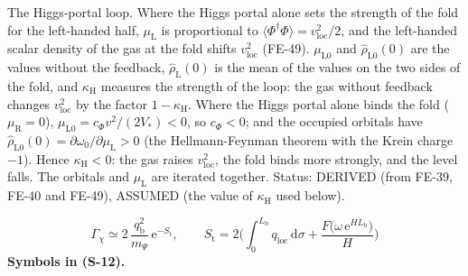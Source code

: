 \documentclass[
  10pt,
]{article}
\begin{document}
The Higgs-portal loop. Where the Higgs portal alone sets the strength of
the fold for the left-handed half, \(\mu_{\mathrm{L}}\) is proportional
to \(\langle\Phi^\dagger\Phi\rangle = v_{\mathrm{loc}}^2/2\), and the
left-handed scalar density of the gas at the fold shifts
\(v_{\mathrm{loc}}^2\) (FE-49). \(\mu_{\mathrm{L}0}\) and
\(\hat\rho_{\mathrm{L}0}(0)\) are the values without the feedback,
\(\hat\rho_{\mathrm{L}}(0)\) is the mean of the values on the two sides
of the fold, and \(\kappa_{\mathrm{H}}\) measures the strength of the
loop: the gas without feedback changes \(v_{\mathrm{loc}}^2\) by the
factor \(1 - \kappa_{\mathrm{H}}\). Where the Higgs portal alone binds
the fold (\(\mu_{\mathrm{R}} = 0\)),
\(\mu_{\mathrm{L}0} = c_\Phi v^2/(2V_*) < 0\), so \(c_\Phi < 0\); and
the occupied orbitals have
\(\hat\rho_{\mathrm{L}0}(0) = \partial\omega_0/\partial\mu_{\mathrm{L}} > 0\)
(the Hellmann-Feynman theorem with the Krein charge \(-1\)). Hence
\(\kappa_{\mathrm{H}} < 0\): the gas raises \(v_{\mathrm{loc}}^2\), the
fold binds more strongly, and the level falls. The orbitals and
\(\mu_{\mathrm{L}}\) are iterated together. Status: DERIVED (from FE-39,
FE-40 and FE-49), ASSUMED (the value of \(\kappa_{\mathrm{H}}\) used
below).

\[
\Gamma_\chi \simeq 2\,\frac{q_{\mathrm{b}}^2}{m_\Psi}\,\mathrm{e}^{-S_{\mathrm{t}}},\qquad
S_{\mathrm{t}} = 2\Big(\int_0^{L_{\mathrm{b}}}q_{\mathrm{loc}}\,\mathrm{d}\sigma + \frac{F\big(\omega\,\mathrm{e}^{HL_{\mathrm{b}}}\big)}{H}\Big) \tag{S-12}
\] \textbf{Symbols in (S-12).}
\end{document}
